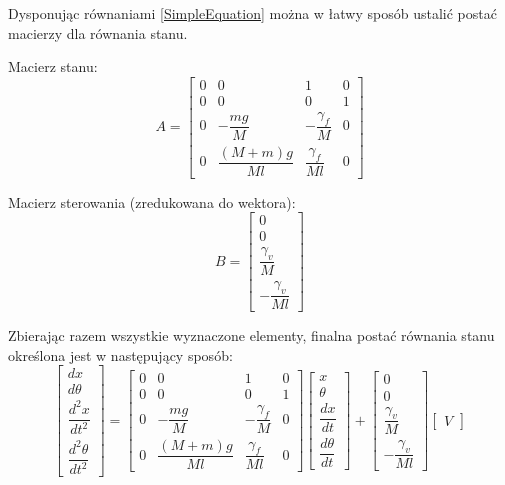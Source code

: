\documentclass[12pt, oneside]{report}
\theoremstyle{definition}
\begin{document}
Dysponując równaniami \ref{SimpleEquation} można w łatwy sposób ustalić postać macierzy dla równania stanu.

Macierz stanu:
\begin{equation}
A = 
\begin{bmatrix}
    0 & 0                  & 1                    & 0 \\
    0 & 0                  & 0                    & 1 \\
    0 & -\dfrac{mg}{M}     & -\dfrac{\gamma_f}{M} & 0 \\[8pt]
    0 & \dfrac{(M+m)g}{Ml} & \dfrac{\gamma_f}{Ml} & 0
\end{bmatrix}
\end{equation}

Macierz sterowania (zredukowana do wektora):
\begin{equation}
B = 
\begin{bmatrix}
    0 \\
    0 \\
    \dfrac{\gamma_v}{M} \\[8pt]
    -\dfrac{\gamma_v}{Ml}
\end{bmatrix}
\end{equation}

Zbierając razem wszystkie wyznaczone elementy, finalna postać równania stanu określona jest w następujący sposób:
\begin{equation}
\begin{bmatrix}
dx \\ 
d\theta \\ 
\dfrac{d^2x}{dt^2} \\[8pt] 
\dfrac{d^2\theta}{dt^2}
\end{bmatrix}
= 
\begin{bmatrix}
    0 & 0                  & 1                    & 0 \\
    0 & 0                  & 0                    & 1 \\
    0 & -\dfrac{mg}{M}     & -\dfrac{\gamma_f}{M} & 0 \\[8pt]
    0 & \dfrac{(M+m)g}{Ml} & \dfrac{\gamma_f}{Ml} & 0
\end{bmatrix}
\begin{bmatrix}
x \\ 
\theta \\ 
\dfrac{dx}{dt} \\[8pt] 
\dfrac{d\theta}{dt}
\end{bmatrix}
+
\begin{bmatrix}
    0 \\
    0 \\
    \dfrac{\gamma_v}{M} \\[8pt]
    -\dfrac{\gamma_v}{Ml}
\end{bmatrix}
\begin{bmatrix}
V
\end{bmatrix}
\end{equation}
\end{document}
